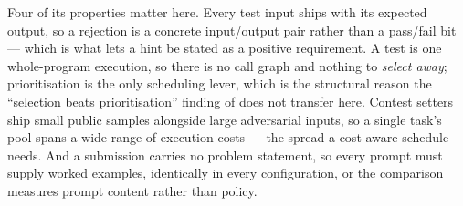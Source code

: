 Four of its properties matter here. Every test input ships with its expected
output, so a rejection is a concrete input/output pair rather than a pass/fail
bit --- which is what lets a hint be stated as a positive requirement. A test
is one whole-program execution, so there is no call graph and nothing to
\emph{select away}; prioritisation is the only scheduling lever, which is the
structural reason the ``selection beats prioritisation'' finding of
\citet{lou2024aprregression} does not transfer here. Contest setters ship small
public samples alongside large adversarial inputs, so a single task's pool
spans a wide range of execution costs --- the spread a cost-aware schedule
needs. And a submission carries no problem statement, so every prompt must
supply worked examples, identically in every configuration, or the comparison
measures prompt content rather than policy.
